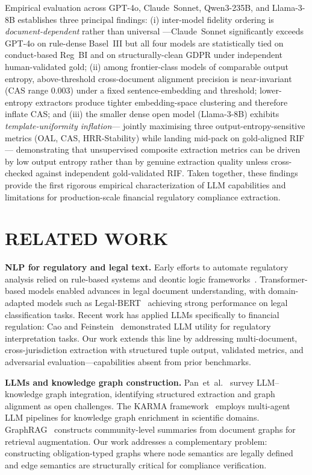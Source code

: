 \documentclass{article}
\begin{document}
Empirical evaluation across GPT-4o, Claude~Sonnet, Qwen3-235B, and
Llama-3-8B establishes three principal findings: (i) inter-model
fidelity ordering is \emph{document-dependent} rather than universal
---Claude~Sonnet significantly exceeds GPT-4o on rule-dense Basel~III
but all four models are statistically tied on conduct-based Reg~BI
and on structurally-clean GDPR under independent human-validated
gold; (ii) among frontier-class models of comparable output entropy,
above-threshold cross-document alignment precision is near-invariant
(CAS range 0.003) under a fixed sentence-embedding and threshold;
lower-entropy extractors produce tighter embedding-space clustering
and therefore inflate CAS; and (iii) the smaller dense open model
(Llama-3-8B) exhibits \textit{template-uniformity inflation}---
jointly maximising three output-entropy-sensitive metrics (OAL, CAS,
HRR-Stability) while landing mid-pack on gold-aligned RIF---
demonstrating that unsupervised composite extraction metrics can be
driven by low output entropy rather than by genuine extraction
quality unless cross-checked against independent gold-validated RIF.
Taken together, these findings provide the first rigorous empirical
characterization of LLM capabilities and limitations for
production-scale financial regulatory compliance extraction.

\section{RELATED WORK}

\textbf{NLP for regulatory and legal text.}
Early efforts to automate regulatory analysis relied on rule-based
systems and deontic logic frameworks~\cite{governatore2005}.
Transformer-based models enabled advances in legal document understanding,
with domain-adapted models such as Legal-BERT~\cite{chalkidis2020}
achieving strong performance on legal classification tasks.
Recent work has applied LLMs specifically to financial regulation:
Cao and Feinstein~\cite{cao2024} demonstrated LLM utility for regulatory
interpretation tasks.
Our work extends this line by addressing multi-document,
cross-jurisdiction extraction with structured tuple output, validated
metrics, and adversarial evaluation---capabilities absent from prior
benchmarks.

\textbf{LLMs and knowledge graph construction.}
Pan~et~al.~\cite{pan2024} survey LLM--knowledge graph integration,
identifying structured extraction and graph alignment as open challenges.
The KARMA framework~\cite{karma2025} employs multi-agent LLM pipelines
for knowledge graph enrichment in scientific domains.
GraphRAG~\cite{graphrag2024} constructs community-level summaries from
document graphs for retrieval augmentation.
Our work addresses a complementary problem: constructing obligation-typed
graphs where node semantics are legally defined and edge semantics
are structurally critical for compliance verification.
\end{document}
